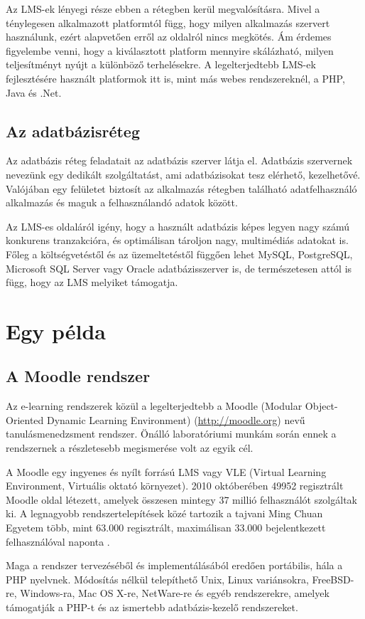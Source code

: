 Az LMS-ek lényegi része ebben a rétegben kerül megvalósításra. Mivel a ténylegesen alkalmazott platformtól függ, hogy milyen alkalmazás szervert használunk, ezért alapvetően erről az oldalról nincs megkötés. Ám érdemes figyelembe venni, hogy a kiválasztott platform mennyire skálázható, milyen teljesítményt nyújt a különböző terhelésekre. A legelterjedtebb LMS-ek fejlesztésére használt platformok itt is, mint más webes rendszereknél, a PHP, Java és .Net.

\subsection{Az adatbázisréteg}
Az adatbázis réteg feladatait az adatbázis szerver látja el. Adatbázis szervernek nevezünk egy dedikált szolgáltatást, ami adatbázisokat tesz elérhető, kezelhetővé. Valójában egy felületet biztosít az alkalmazás rétegben található adatfelhasználó alkalmazás és maguk a felhasználandó adatok között.

Az LMS-es oldaláról igény, hogy a használt adatbázis képes legyen nagy számú konkurens tranzakcióra, és optimálisan tároljon nagy, multimédiás adatokat is. Főleg a költségvetéstől és az üzemeltetéstől függően lehet MySQL, PostgreSQL, Microsoft SQL Server vagy Oracle adatbázisszerver is, de természetesen attól is függ, hogy az LMS melyiket támogatja. 

\section{Egy példa}
\subsection{A Moodle rendszer}
Az e-learning rendszerek közül a legelterjedtebb a Moodle (Modular Object-Oriented Dynamic Learning Environment) (\href{http://moodle.org}{http://moodle.org}) nevű tanulásmenedzsment rendszer. Önálló laboratóriumi munkám során ennek a rendszernek a részletesebb megismerése volt az egyik cél.

A Moodle  egy ingyenes és nyílt forrású LMS vagy VLE (Virtual Learning Environment, Virtuális oktató környezet). 2010 októberében 49952 regisztrált Moodle oldal létezett, amelyek összesen mintegy 37 millió felhasználót szolgáltak ki. A legnagyobb rendszertelepítések közé tartozik a tajvani Ming Chuan Egyetem több, mint 63.000 regisztrált, maximálisan 33.000 bejelentkezett felhasználóval naponta \cite{moodleinstplus}.

Maga a rendszer tervezéséből és implementálásából eredően portábilis, hála a PHP nyelvnek. Módosítás nélkül telepíthető Unix, Linux variánsokra, FreeBSD-re, Windows-ra, Mac OS X-re, NetWare-re és egyéb rendszerekre, amelyek támogatják a PHP-t és az ismertebb adatbázis-kezelő rendszereket.

